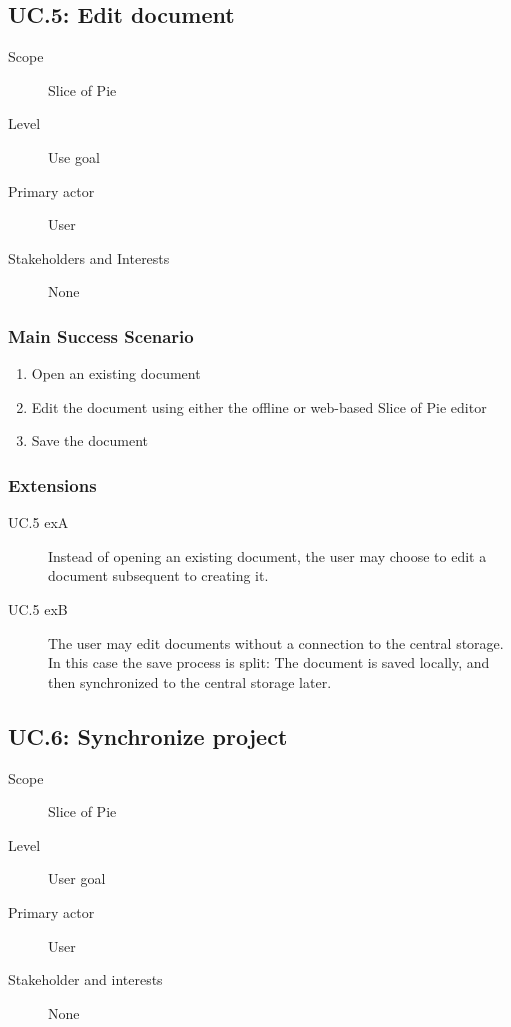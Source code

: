 \subsection{UC.5: Edit document}
\begin{description}
    \item[Scope] Slice of Pie
    \item[Level] Use goal
    \item[Primary actor] User
    \item[Stakeholders and Interests] None
\end{description}

\subsubsection{Main Success Scenario}
\begin{enumerate}
    \item Open an existing document
    \item Edit the document using either the offline or web-based Slice of Pie editor
    \item Save the document
\end{enumerate}
    
\subsubsection{Extensions}
\begin{description}
    \item[UC.5 exA] Instead of opening an existing document, the user may choose to edit a document subsequent to creating it.
    \item[UC.5 exB] The user may edit documents without a connection to the central storage. In this case the save process is split: The document is saved locally, and then synchronized to the central storage later.
\end{description}

\subsection{UC.6: Synchronize project}
\begin{description}
    \item[Scope] Slice of Pie
    \item[Level] User goal
    \item[Primary actor] User
    \item[Stakeholder and interests] None
\end{description}
    
